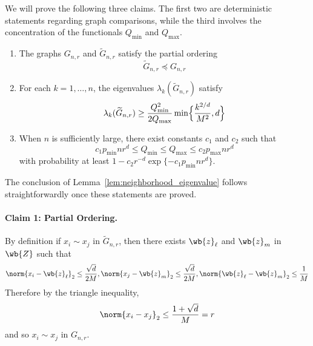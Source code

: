 \documentclass{article}
\newcommand{\1}{\mathbf{1}}
\newcommand{\wt}[1]{\widetilde{#1}}
\theoremstyle{alden}
\theoremstyle{aldenthm}
\theoremstyle{definition}
\theoremstyle{remark}
\begin{document}
We will prove the following three claims. The first two are deterministic statements regarding graph comparisons, while the third involves the concentration of the functionals $Q_{\min}$ and $Q_{\max}$.  
\begin{enumerate}
	\item The graphs $G_{n,r}$ and $\wt{G}_{n,r}$ satisfy the partial ordering
	\begin{equation*}
	\wt{G}_{n,r}\preceq G_{n,r} 
	\end{equation*}
	\item For each $k = 1,\ldots,n$, the eigenvalues $\lambda_k(\wt{G}_{n,r})$ satisfy
	\begin{equation*}
	\lambda_k(\wt{G}_{n,r}) \geq \frac{Q_{\min}^2}{2 Q_{\max}}\min\Bigl\{\frac{k^{2/d}}{M^2}, d\Bigr\}
	\end{equation*}
	\item When $n$ is sufficiently large, there exist constants $c_1$ and $c_2$ such that
	\begin{equation*}
	c_1 p_{\min} n r^d \leq Q_{\min} \leq Q_{\max} \leq c_2 p_{\max} n r^d
	\end{equation*}
	with probability at least $1 - c_2 r^{-d} \exp \{-c_1 p_{\min} n r^d\}$. 
\end{enumerate}
The conclusion of Lemma~\ref{lem:neighborhood_eigenvalue} follows straightforwardly once these statements are proved.

\paragraph{Claim 1: Partial Ordering.}
By definition if $x_i \sim x_j$ in $\wt{G}_{n,r}$, then there exists $\wb{z}_{\ell}$ and $\wb{z}_{m}$ in $\wb{Z}$ such that
\begin{equation*}
\norm{x_i - \wb{z}_{\ell}}_2 \leq \frac{\sqrt{d}}{2M}, \norm{x_j - \wb{z}_{m}}_2 \leq \frac{\sqrt{d}}{2M}, \norm{\wb{z}_{\ell} - \wb{z}_m}_2 \leq \frac{1}{M}
\end{equation*}
Therefore by the triangle inequality,
\begin{equation*}
\norm{x_i - x_j}_2 \leq \frac{1 + \sqrt{d}}{M} = r
\end{equation*}
and so $x_i \sim x_j$ in $G_{n,r}$. 
\end{document}
